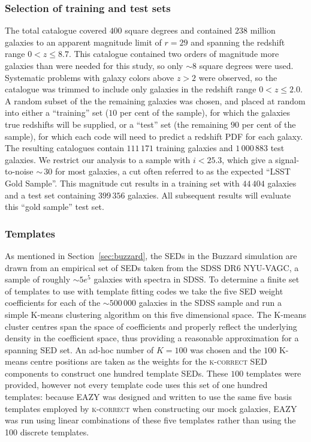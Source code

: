 \subsubsection{Selection of training and test sets}
\label{sec:buzztraining}
The total catalogue covered $400$ square degrees and contained $238$ million galaxies to an apparent magnitude limit of $r\!=\!29$ and spanning the redshift range $0\!<\!z\!\leq\!8.7$. This catalogue contained two orders of magnitude more galaxies than were needed for this study, so only $\sim\!8$ square degrees were used. Systematic problems with galaxy colors above $z\!>\!2$ were observed, so the catalogue was trimmed to include only galaxies in the redshift range $0\!<\!z\!\leq\!2.0$. A random subset of the the remaining galaxies was chosen, and placed at random into either a ``training'' set ($10$ per cent of the sample), for which the galaxies true redshifts will be supplied, or a ``test'' set (the remaining $90$ per cent of the sample), for which each code will need to predict a redshift PDF for each galaxy. The resulting catalogues contain $111\,171$ training galaxies and $1\,000\,883$ test galaxies.  We restrict our analysis to a sample with $i<25.3$, which give a signal-to-noise $\sim\,30$ for most galaxies, a cut often referred to as the expected ``LSST Gold Sample''.  This magnitude cut results in a training set with $44\,404$ galaxies and a test set containing $399\,356$ galaxies.  All subsequent results will evaluate this ``gold sample'' test set.

\subsubsection{Templates}
\label{sec:buzztemplates}
As mentioned in Section~\ref{sec:buzzard}, the SEDs in the Buzzard simulation are drawn from an empirical set of SEDs taken from the SDSS DR6 NYU-VAGC, a sample of roughly $\sim5e^{5}$ galaxies with spectra in SDSS. To determine a finite set of templates to use with template fitting codes we take the five SED weight coefficients for each of the $\sim 500\,000$ galaxies in the SDSS sample and run a simple K-means clustering algorithm on this five dimensional space. The K-means cluster centres span the space of coefficients and properly reflect the underlying density in the coefficient space, thus providing a reasonable approximation for a spanning SED set. An ad-hoc number of $K=100$ was chosen and the $100$ K-means centre positions are taken as the weights for the \textsc{k-correct} SED components to construct one hundred template SEDs. These $100$ templates were provided,
however not every template code uses this set of one hundred templates: because EAZY was designed and written to use the same five basis templates employed by \textsc{k-correct} when constructing our mock galaxies, EAZY was run using linear combinations of these five templates rather than using the 100 discrete templates.


